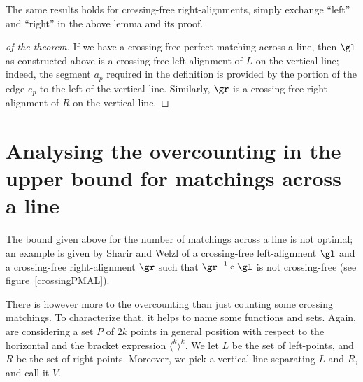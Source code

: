 \documentclass[10pt, a4paper, twoside]{basestyle}
\begin{document}
The same results holds for crossing-free right-alignments, simply exchange ``left'' and ``right'' in the above
lemma and its proof.

\begin{proof}[of the theorem]
If we have a crossing-free perfect matching across a line, then $\gl$ as constructed above is a crossing-free
left-alignment of $L$ on the vertical line; indeed, the segment $a_p$ required in the definition is provided by
the portion of the edge $e_p$ to the left of the vertical line.
Similarly, $\gr$ is a crossing-free right-alignment of $R$ on the vertical line.
\end{proof}
\section{Analysing the overcounting in the upper bound for matchings across a line}
The bound given above for the number of matchings across a line is not optimal;
an example is given by Sharir and Welzl of a crossing-free left-alignment $\gl$ and a crossing-free
right-alignment $\gr$ such that $\gr^{-1}\Compose \gl$ is not crossing-free (see figure~\ref{crossingPMAL}).

There is however more to the overcounting than just counting some crossing matchings.
To characterize that, it helps to name some functions and sets. Again, are considering a
set $P$ of $2k$ points in general position with respect to the horizontal and the bracket
expression $\langle^k\rangle^k$.  We let $L$ be the set of left-points, and $R$ be the
set of right-points. Moreover, we pick a vertical line separating $L$ and $R$, and call it
$V$.
\end{document}
